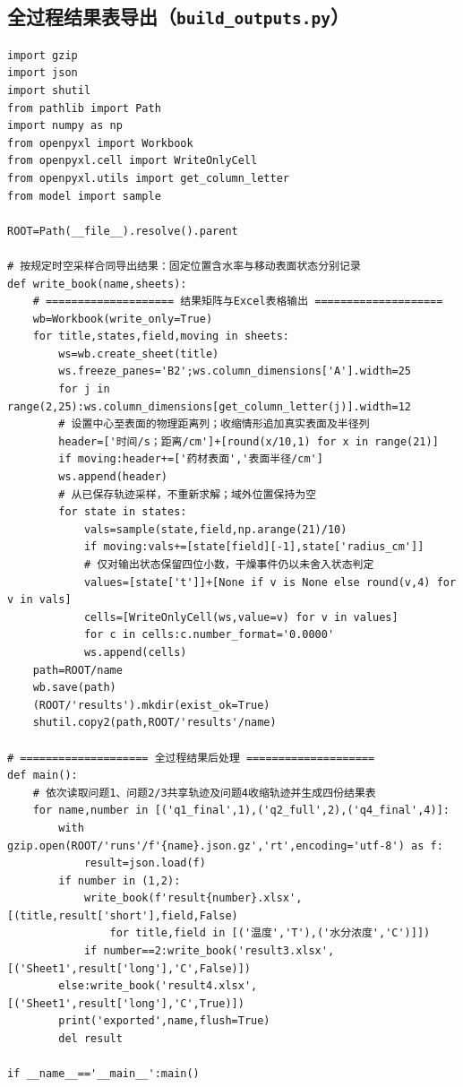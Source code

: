\subsection{全过程结果表导出（\texttt{build\_outputs.py}）}
\begin{Verbatim}[fontsize=\scriptsize,breaklines=true,breakanywhere=true]
import gzip
import json
import shutil
from pathlib import Path
import numpy as np
from openpyxl import Workbook
from openpyxl.cell import WriteOnlyCell
from openpyxl.utils import get_column_letter
from model import sample

ROOT=Path(__file__).resolve().parent

# 按规定时空采样合同导出结果：固定位置含水率与移动表面状态分别记录
def write_book(name,sheets):
    # ==================== 结果矩阵与Excel表格输出 ====================
    wb=Workbook(write_only=True)
    for title,states,field,moving in sheets:
        ws=wb.create_sheet(title)
        ws.freeze_panes='B2';ws.column_dimensions['A'].width=25
        for j in range(2,25):ws.column_dimensions[get_column_letter(j)].width=12
        # 设置中心至表面的物理距离列；收缩情形追加真实表面及半径列
        header=['时间/s；距离/cm']+[round(x/10,1) for x in range(21)]
        if moving:header+=['药材表面','表面半径/cm']
        ws.append(header)
        # 从已保存轨迹采样，不重新求解；域外位置保持为空
        for state in states:
            vals=sample(state,field,np.arange(21)/10)
            if moving:vals+=[state[field][-1],state['radius_cm']]
            # 仅对输出状态保留四位小数，干燥事件仍以未舍入状态判定
            values=[state['t']]+[None if v is None else round(v,4) for v in vals]
            cells=[WriteOnlyCell(ws,value=v) for v in values]
            for c in cells:c.number_format='0.0000'
            ws.append(cells)
    path=ROOT/name
    wb.save(path)
    (ROOT/'results').mkdir(exist_ok=True)
    shutil.copy2(path,ROOT/'results'/name)

# ==================== 全过程结果后处理 ====================
def main():
    # 依次读取问题1、问题2/3共享轨迹及问题4收缩轨迹并生成四份结果表
    for name,number in [('q1_final',1),('q2_full',2),('q4_final',4)]:
        with gzip.open(ROOT/'runs'/f'{name}.json.gz','rt',encoding='utf-8') as f:
            result=json.load(f)
        if number in (1,2):
            write_book(f'result{number}.xlsx',[(title,result['short'],field,False)
                for title,field in [('温度','T'),('水分浓度','C')]])
            if number==2:write_book('result3.xlsx',[('Sheet1',result['long'],'C',False)])
        else:write_book('result4.xlsx',[('Sheet1',result['long'],'C',True)])
        print('exported',name,flush=True)
        del result

if __name__=='__main__':main()
\end{Verbatim}


